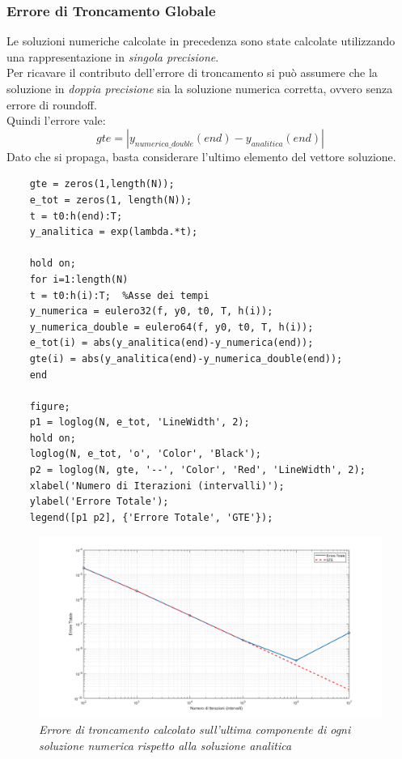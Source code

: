 \subsubsection{Errore di Troncamento Globale}
Le soluzioni numeriche calcolate in precedenza sono state calcolate utilizzando una rappresentazione in \textit{singola precisione}. 
\\Per ricavare il contributo dell'errore di troncamento si può assumere che la soluzione in \textit{doppia precisione} sia la soluzione numerica corretta, ovvero senza errore di roundoff.
\\Quindi l'errore vale:
\begin{equation*}
	gte = |y_{numerica\_double}(end) - y_{analitica}(end)|
\end{equation*}
Dato che si propaga, basta considerare l'ultimo elemento del vettore soluzione.
\begin{verbatim}
	gte = zeros(1,length(N));
	e_tot = zeros(1, length(N));
	t = t0:h(end):T;
	y_analitica = exp(lambda.*t);
	
	hold on;
	for i=1:length(N)
	t = t0:h(i):T;  %Asse dei tempi
	y_numerica = eulero32(f, y0, t0, T, h(i));
	y_numerica_double = eulero64(f, y0, t0, T, h(i));
	e_tot(i) = abs(y_analitica(end)-y_numerica(end));
	gte(i) = abs(y_analitica(end)-y_numerica_double(end));
	end
	
	figure;
	p1 = loglog(N, e_tot, 'LineWidth', 2);
	hold on;
	loglog(N, e_tot, 'o', 'Color', 'Black');
	p2 = loglog(N, gte, '--', 'Color', 'Red', 'LineWidth', 2);
	xlabel('Numero di Iterazioni (intervalli)');
	ylabel('Errore Totale');
	legend([p1 p2], {'Errore Totale', 'GTE'});
\end{verbatim}
\begin{figure}[H]
	\centering   
	\includegraphics[width=\textwidth]{matlab/esercizio1_errore_troncamento.png}
	\caption{\textit{Errore di troncamento calcolato sull'ultima componente di ogni soluzione numerica rispetto alla soluzione analitica}}
\end{figure}

